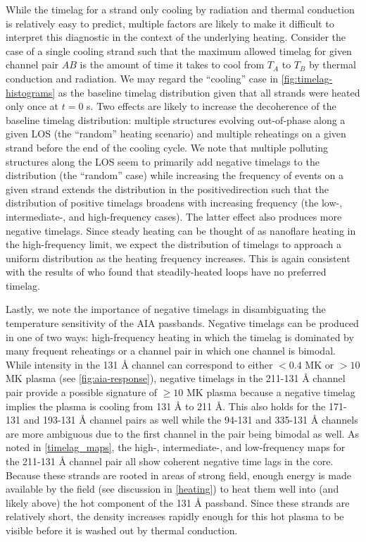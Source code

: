 While the timelag for a strand only cooling by radiation and thermal conduction is relatively easy to predict, multiple factors are likely to make it difficult to interpret this diagnostic in the context of the underlying heating. Consider the case of a single cooling strand such that the maximum allowed timelag for given channel pair $AB$ is the amount of time it takes to cool from $T_A$ to $T_B$ by thermal conduction and radiation. We may regard the ``cooling'' case in \autoref{fig:timelag-histograms} as the baseline timelag distribution given that all strands were heated only once at $t=0$ s. Two effects are likely to increase the decoherence of the baseline timelag distribution: multiple structures evolving out-of-phase along a given LOS (the ``random'' heating scenario) and multiple reheatings on a given strand before the end of the cooling cycle. We note that multiple polluting structures along the LOS seem to primarily add negative timelags to the distribution (the ``random'' case) while increasing the frequency of events on a given strand extends the distribution in the positivedirection such that the distribution of positive timelags broadens with increasing frequency (the low-, intermediate-, and high-frequency cases). The latter effect also produces more negative timelags. Since steady heating can be thought of as nanoflare heating in the high-frequency limit, we expect the distribution of timelags to approach a uniform distribution as the heating frequency increases. This is again consistent with the results of \citet{viall_signatures_2016} who found that steadily-heated loops have no preferred timelag.

Lastly, we note the importance of negative timelags in disambiguating the temperature sensitivity of the AIA passbands. Negative timelags can be produced in one of two ways: high-frequency heating in which the timelag is dominated by many frequent reheatings or a channel pair in which one channel is bimodal. While intensity in the 131 \AA{} channel can correspond to either $<0.4$ MK or $>10$ MK plasma (see \autoref{fig:aia-response}), negative timelags in the 211-131 \AA{} channel pair provide a possible signature of $\ge10$ MK plasma because a negative timelag implies the plasma is cooling from 131 \AA{} to 211 \AA{}. This also holds for the 171-131 and 193-131 \AA{} channel pairs as well while the 94-131 and 335-131 \AA{} channels are more ambiguous due to the first channel in the pair being bimodal as well. As noted in \autoref{timelag_maps}, the high-, intermediate-, and low-frequency maps for the 211-131 \AA{} channel pair all show coherent negative time lags in the core. Because these strands are rooted in areas of strong field, enough energy is made available by the field (see discussion in \autoref{heating}) to heat them well into (and likely above) the hot component of the 131 \AA{} passband. Since these strands are relatively short, the density increases rapidly enough for this hot plasma to be visible before it is washed out by thermal conduction.
